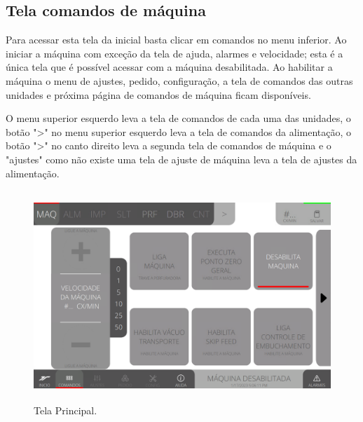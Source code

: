 \thispagestyle{fancy}

\vspace*{\fill}

\subsection{Tela comandos de máquina}

Para acessar esta tela da inicial basta clicar em comandos no menu inferior. Ao iniciar a máquina com exceção da tela de ajuda, alarmes e velocidade; esta é a única tela que é possível acessar com a máquina desabilitada. Ao habilitar a máquina o menu de ajustes, pedido, configuração, a tela de comandos das outras unidades e próxima página de comandos de máquina ficam disponíveis.

O menu superior esquerdo leva a tela de comandos de cada uma das unidades, o botão "\textgreater" no menu superior esquerdo leva a tela de comandos da alimentação, o botão "\textgreater" no canto direito leva a segunda tela de comandos de máquina e o "ajustes" como não existe uma tela de ajuste de máquina leva a tela de ajustes da alimentação.

\vspace*{10pt}

\begin{figure}[h]
  \centering
  \includegraphics[width=480px,height=300px]{src/imagesFlexo/02-machine/e-Tela-Principal.png}
  \caption{Tela Principal.}
   \label{}
\end{figure}

\vspace*{\fill}

\newpage
\thispagestyle{fancy}

\vspace*{\fill}

